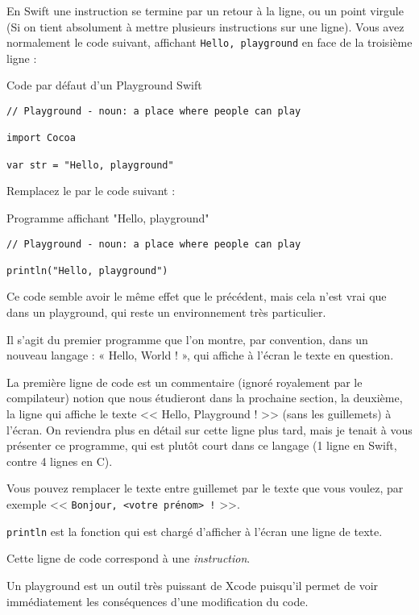 En Swift une instruction se termine par un retour à la ligne, ou un point virgule
(Si on tient absolument à mettre plusieurs instructions sur une ligne).
Vous avez normalement le code suivant,
affichant \verb"Hello, playground" en face de la troisième ligne :
\begin{listing}[h]
\caption{Code par défaut d'un Playground Swift}
\begin{verbatim}
// Playground - noun: a place where people can play

import Cocoa

var str = "Hello, playground"
\end{verbatim}
\end{listing}

Remplacez le par le code suivant :
\begin{listing}[h]
\caption{Programme affichant "Hello, playground"}
\begin{verbatim}
// Playground - noun: a place where people can play

println("Hello, playground")
\end{verbatim}
\end{listing}

Ce code semble avoir le même effet que le précédent,
mais cela n'est vrai que dans un playground,
qui reste un environnement très particulier.

Il s’agit du premier programme que l’on montre,
par convention, dans un nouveau langage :
« Hello, World ! », qui affiche à l’écran le texte en question.

La première ligne de code est un commentaire
(ignoré royalement par le compilateur)
notion que nous étudieront dans la prochaine section,
la deuxième, la ligne qui affiche le texte << Hello, Playground ! >>
(sans les guillemets) à l’écran.
On reviendra plus en détail sur cette ligne plus tard,
mais je tenait à vous présenter ce programme,
qui est plutôt court dans ce langage
(1 ligne en Swift, contre 4 lignes en C).

Vous pouvez remplacer le texte entre guillemet par le texte que vous voulez,
par exemple << \verb"Bonjour, <votre prénom> !" >>.

\texttt{println} est la fonction
qui est chargé d’afficher à l’écran une ligne de texte.

Cette ligne de code correspond à une \emph{instruction}.

Un playground est un outil très puissant de Xcode
puisqu’il permet de voir immédiatement
les conséquences d’une modification du code.
